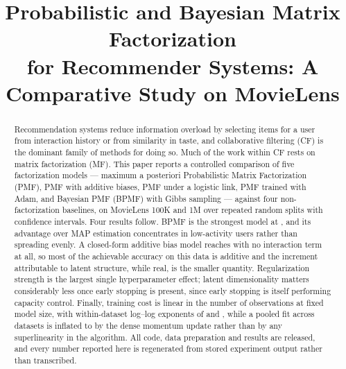 \documentclass[conference]{IEEEtran}
\begin{document}
\title{Probabilistic and Bayesian Matrix Factorization\\
for Recommender Systems: A Comparative Study on MovieLens}

\author{
}

\maketitle

\begin{abstract}
Recommendation systems reduce information overload by selecting items for a user from
interaction history or from similarity in taste, and collaborative filtering (CF) is the
dominant family of methods for doing so. Much of the work within CF rests on matrix
factorization (MF). This paper reports a controlled comparison of five factorization
models --- maximum a posteriori Probabilistic Matrix Factorization (PMF), PMF with additive
biases, PMF under a logistic link, PMF trained with Adam, and Bayesian PMF (BPMF) with
Gibbs sampling --- against four non-factorization baselines, on MovieLens 100K and 1M over
repeated random splits with confidence intervals. Four results follow. BPMF is the
strongest model at \BestRMSE, and its advantage over MAP estimation concentrates in
low-activity users rather than spreading evenly. A closed-form additive bias model reaches
\BiasBaselineRMSE{} with no interaction term at all, so most of the achievable accuracy on
this data is additive and the increment attributable to latent structure, while real, is
the smaller quantity. Regularization strength is the largest single hyperparameter effect;
latent dimensionality matters considerably less once early stopping is present, since early
stopping is itself performing capacity control. Finally, training cost is linear in the
number of observations at fixed model size, with within-dataset log--log exponents of
\ScalingSlopeOneHundredK{} and \ScalingSlopeOneM, while a pooled fit across datasets is
inflated to \ScalingSlope{} by the dense momentum update rather than by any superlinearity
in the algorithm. All code, data preparation and results are released, and every number
reported here is regenerated from stored experiment output rather than transcribed.
\end{abstract}
\end{document}
